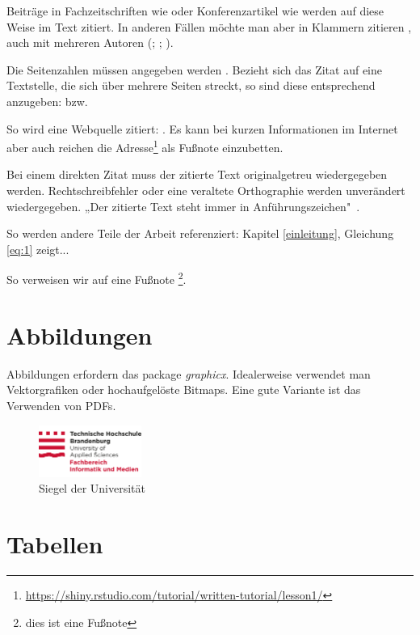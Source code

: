 Beiträge in Fachzeitschriften wie \citet[12]{clemen1989combining} oder Konferenzartikel wie \citet[6]{he2017mask} werden auf diese Weise im Text zitiert. In anderen Fällen möchte man aber in Klammern zitieren \citep[10]{clemen1989combining}, auch mit mehreren Autoren (\citealp[3]{baumol1958warehouse}; \citealp[15]{clemen1989combining}; \citealp[12]{he2017mask}).

Die Seitenzahlen müssen angegeben werden \citep[28]{chollet2018deep}. Bezieht sich das Zitat auf eine Textstelle, die sich über mehrere Seiten streckt, so sind diese entsprechend anzugeben: \citet[28-29]{chollet2018deep} bzw. \citet[28-35]{chollet2018deep}

So wird eine Webquelle zitiert: \citet{shiny1}. Es kann bei kurzen Informationen im Internet aber auch reichen die Adresse\footnote{\url{https://shiny.rstudio.com/tutorial/written-tutorial/lesson1/}} als Fußnote einzubetten.

Bei einem direkten Zitat muss der zitierte Text originalgetreu wiedergegeben werden. Rechtschreibfehler oder eine veraltete Orthographie werden unverändert wiedergegeben. „Der zitierte Text steht immer in Anführungszeichen"\ \citep[28]{chollet2018deep}. 

So werden andere Teile der Arbeit referenziert: Kapitel \ref{einleitung}, Gleichung \ref{eq:1} zeigt...

So verweisen wir auf eine Fußnote \footnote{dies ist eine Fußnote}.

\section{Abbildungen}

Abbildungen erfordern das package \textit{graphicx}. 
Idealerweise verwendet man Vektorgrafiken oder hochaufgelöste Bitmaps. 
Eine gute Variante ist das Verwenden von PDFs.

\begin{figure}[h]
    \centering
    \includegraphics[width=0.3\textwidth]{figs/2015_10_05_THB_FB-IM_Logo_RGB.pdf}
    \caption{Siegel der Universität}
    \label{fig:my_label}
\end{figure}


\section{Tabellen}

